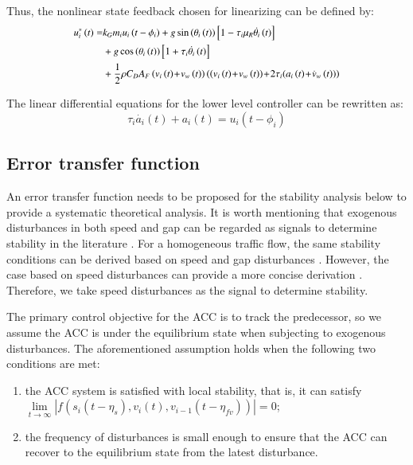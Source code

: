 \documentclass[journal]{IEEEtran}
\begin{document}
Thus, the nonlinear state feedback chosen for linearizing can be defined by:
\begin{equation}
  \begin{small}
    \begin{aligned}
      u_i^\ast\left(t\right)  = & k_Gm_iu_i\left(t-\phi_i\right)+g\sin{\left(\theta_i\left(t\right)\right)}\left[1-\tau_i\mu_R\dot{\theta_i}\left(t\right)\right]                                                                           \\ & +g\cos{\left(\theta_i\left(t\right)\right)}\left[1+\tau_i\dot{\theta_i}\left(t\right)\right] \\
                                & +\frac{1}{2}\rho C_DA_F\left(v_i\left(t\right)\!+\!v_w\left(t\right)\right)\left(\left(v_i\left(t\right)\!+\!v_w\left(t\right)\right)\!+\!2\tau_i(a_i\left(t\right)\!+\!\dot{v}_{w}\left(t\right))\right)
    \end{aligned}
  \end{small}
  \label{Eq18}
\end{equation}

The linear differential equations for the lower level controller can be rewritten as:
\begin{equation}
  \tau_i\dot{a_i}\left(t\right)+a_i\left(t\right)=u_i(t-\phi_i)
  \label{Eq19}
\end{equation}



\subsection{Error transfer function}
\label{Section 4.2}

An error transfer function needs to be proposed for the stability analysis below to provide a systematic theoretical analysis. It is worth mentioning that exogenous disturbances in both speed and gap can be regarded as signals to determine stability in the literature \citep{Feng2019,Qin2018,Navas2019,Jin2014}. For a homogeneous traffic flow, the same stability conditions can be derived based on speed and gap disturbances \citep{Montanino2021,Montanino2021a,Zheng2015}. However, the case based on speed disturbances can provide a more concise derivation \citep{Wang2018a}. Therefore, we take speed disturbances as the signal to determine stability.

The primary control objective for the ACC is to track the predecessor, so we assume the ACC is under the equilibrium state when subjecting to exogenous disturbances. The aforementioned assumption holds when the following two conditions are met:
\begin{enumerate}
  \item the ACC system is satisfied with local stability, that is, it can satisfy $\mathop {\lim }\limits_{t \to \infty } \left| {f\left( {{s_i}\left( {t - {\eta _s}} \right),{v_i}(t),{v_{i - 1}}\left( {t - {\eta _{fv}}} \right)} \right)} \right| = 0$;
  \item the frequency of disturbances is small enough to ensure that the ACC can recover to the equilibrium state from the latest disturbance.
\end{enumerate}
\end{document}
